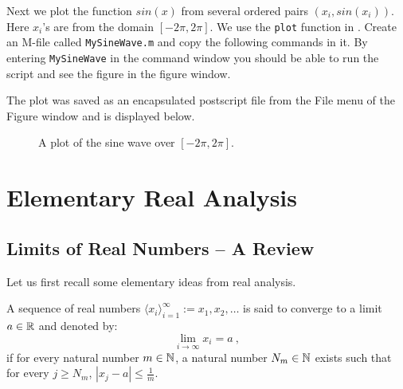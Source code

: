 \begin{labwork}\label{LW:2Dplot}
Next we plot the function $sin(x)$ from several ordered pairs $(x_i,sin(x_i))$.  Here $x_i$'s are from the domain $[-2 \pi, 2 \pi]$.  We use the {\tt plot} function in \Matlab.  Create an M-file called {\tt MySineWave.m} and copy the following commands in it.  By entering {\tt MySineWave} in the command window you should be able to run the script and see the figure in the figure window.


The plot was saved as an encapsulated postscript file from the File menu of the Figure window and is displayed below.
\begin{figure}[ht]
\vspace{2cm}
\caption{A plot of the sine wave over $[-2 \pi, 2 \pi]$.\label{F:sinfunction}}
\end{figure}
\end{labwork}



\section{Elementary Real Analysis}



\subsection{Limits of Real Numbers -- A Review}\label{S:AnalysisRefresher}




Let us first recall some elementary ideas from real analysis.
\begin{definition}\label{Dfn:ConvReals}
A sequence of real numbers  $\langle x_i \rangle_{i=1}^{\infty} := x_1,x_2,\ldots$ is said to converge to a limit $a \in \mathbb{R}$ and denoted by:
\[
\lim_{i \to \infty} x_i = a \ ,
\]
if for every natural number $m \in \mathbb{N}$, a natural number $N_m \in \mathbb{N}$ exists such that for every $j \geq N_m$, $|x_j-a| \leq \frac{1}{m}$.
\end{definition}

